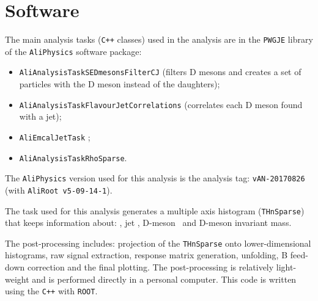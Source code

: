 \section{Software}

The main analysis tasks (\texttt{C++} classes) used in the analysis are in the \texttt{PWGJE} library of the \texttt{AliPhysics} software package:
\begin{itemize}
\item \texttt{AliAnalysisTaskSEDmesonsFilterCJ} (filters D mesons and creates a set of particles with the D meson instead of the daughters);
\item \texttt{AliAnalysisTaskFlavourJetCorrelations} (correlates each D meson found with a jet);
\item \texttt{AliEmcalJetTask} ;%
\item \texttt{AliAnalysisTaskRhoSparse}. %
\end{itemize}
The \texttt{AliPhysics} version used for this analysis is the analysis tag: \texttt{vAN-20170826} (with \texttt{AliRoot v5-09-14-1}).%

The task used for this analysis generates a multiple axis histogram (\texttt{THnSparse}) that keeps information about: \zpar, jet \pt, D-meson \pt\ and D-meson invariant mass.

The post-processing includes: projection of the \texttt{THnSparse} onto lower-dimensional histograms, raw signal extraction, response matrix generation, unfolding, B feed-down correction and the final plotting.
The post-processing is relatively light-weight and is performed directly in a personal computer. This code is written using the \texttt{C++} with \texttt{ROOT}.

%

